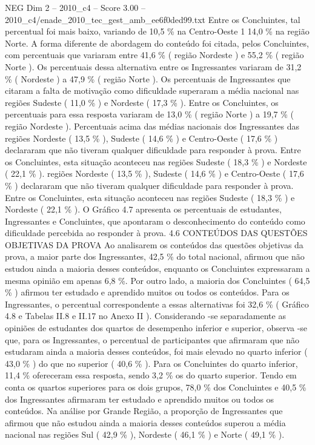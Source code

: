 \begin{textsample}{NEG Dim 2 – 2010\_c4 – Score 3.00 – 2010\_c4/enade\_2010\_tec\_gest\_amb\_ee6f0ded99.txt}
Entre os Concluintes, tal percentual foi mais baixo, variando de 10,5 \% na Centro-Oeste 1 14,0 \% na região Norte.
A forma diferente de abordagem do conteúdo foi citada, pelos Concluintes, com percentuais que variaram entre 41,6 \% ( região Nordeste ) e 55,2 \% ( região Norte ).
Os percentuais dessa alternativa entre os Ingressantes variaram de 31,2 \% ( Nordeste ) a 47,9 \% ( região Norte ).
Os percentuais de Ingressantes que citaram a falta de motivação como dificuldade superaram a média nacional nas regiões Sudeste ( 11,0 \% ) e Nordeste ( 17,3 \% ).
Entre os Concluintes, os percentuais para essa resposta variaram de 13,0 \% ( região Norte ) a 19,7 \% ( região Nordeste ).
Percentuais acima das médias nacionais dos Ingressantes das regiões Nordeste ( 13,5 \% ), Sudeste ( 14,6 \% ) e Centro-Oeste ( 17,6 \% ) declararam que não tiveram qualquer dificuldade para responder à prova.
Entre os Concluintes, esta situação aconteceu nas regiões Sudeste ( 18,3 \% ) e Nordeste ( 22,1 \% ). regiões Nordeste ( 13,5 \% ), Sudeste ( 14,6 \% ) e Centro-Oeste ( 17,6 \% ) declararam que não tiveram qualquer dificuldade para responder à prova.
Entre os Concluintes, esta situação aconteceu nas regiões Sudeste ( 18,3 \% ) e Nordeste ( 22,1 \% ).
O Gráfico 4.7 apresenta os percentuais de estudantes, Ingressantes e Concluintes, que apontaram o desconhecimento do conteúdo como dificuldade percebida ao responder à prova. 4.6 CONTEÚDOS DAS QUESTÕES OBJETIVAS DA PROVA Ao analisarem os conteúdos das questões objetivas da prova, a maior parte dos Ingressantes, 42,5 \% do total nacional, afirmou que não estudou ainda a maioria desses conteúdos, enquanto os Concluintes expressaram a mesma opinião em apenas 6,8 \%.
Por outro lado, a maioria dos Concluintes ( 64,5 \% ) afirmou ter estudado e aprendido muitos ou todos os conteúdos.
Para os Ingressantes, o percentual correspondente a essas alternativas foi 32,6 \% ( Gráfico 4.8 e Tabelas II.8 e II.17 no Anexo II ).
Considerando -se separadamente as opiniões de estudantes dos quartos de desempenho inferior e superior, observa -se que, para os Ingressantes, o percentual de participantes que afirmaram que não estudaram ainda a maioria desses conteúdos, foi mais elevado no quarto inferior ( 43,0 \% ) do que no superior ( 40,6 \% ).
Para os Concluintes do quarto inferior, 11,4 \% ofereceram essa resposta, sendo 3,2 \% os do quarto superior.
Tendo em conta os quartos superiores para os dois grupos, 78,0 \% dos Concluintes e 40,5 \% dos Ingressantes afirmaram ter estudado e aprendido muitos ou todos os conteúdos.
Na análise por Grande Região, a proporção de Ingressantes que afirmou que não estudou ainda a maioria desses conteúdos superou a média nacional nas regiões Sul ( 42,9 \% ), Nordeste ( 46,1 \% ) e Norte ( 49,1 \% ).

\end{textsample}

